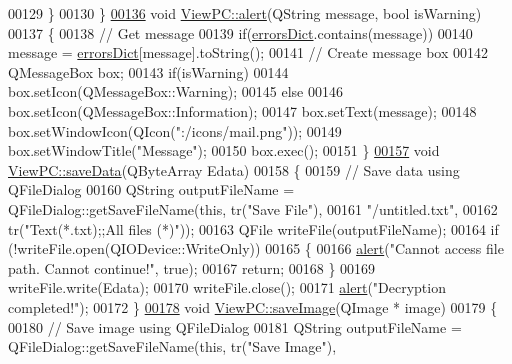 \begin{DoxyCode}
00129     \}
00130 \}
\hypertarget{viewpc_8cpp_source_l00136}{}\hyperlink{class_view_p_c_a7c467169467789561078abc9d4fe57bd}{00136} \textcolor{keywordtype}{void} \hyperlink{class_view_p_c_a7c467169467789561078abc9d4fe57bd}{ViewPC::alert}(QString message, \textcolor{keywordtype}{bool} isWarning)
00137 \{
00138     \textcolor{comment}{// Get message}
00139     \textcolor{keywordflow}{if}(\hyperlink{class_view_p_c_a26f90436aca32e5bad46f5e69a7e7e09}{errorsDict}.contains(message))
00140         message = \hyperlink{class_view_p_c_a26f90436aca32e5bad46f5e69a7e7e09}{errorsDict}[message].toString();
00141     \textcolor{comment}{// Create message box}
00142     QMessageBox box;
00143     \textcolor{keywordflow}{if}(isWarning)
00144         box.setIcon(QMessageBox::Warning);
00145     \textcolor{keywordflow}{else}
00146         box.setIcon(QMessageBox::Information);
00147     box.setText(message);
00148     box.setWindowIcon(QIcon(\textcolor{stringliteral}{":/icons/mail.png"}));
00149     box.setWindowTitle(\textcolor{stringliteral}{"Message"});
00150     box.exec();
00151 \}
\hypertarget{viewpc_8cpp_source_l00157}{}\hyperlink{class_view_p_c_aaff156103970be7c777beedaf0020604}{00157} \textcolor{keywordtype}{void} \hyperlink{class_view_p_c_aaff156103970be7c777beedaf0020604}{ViewPC::saveData}(QByteArray Edata)
00158 \{
00159     \textcolor{comment}{// Save data using QFileDialog}
00160     QString outputFileName = QFileDialog::getSaveFileName(\textcolor{keyword}{this}, tr(\textcolor{stringliteral}{"Save File"}),
00161                                \textcolor{stringliteral}{"/untitled.txt"},
00162                                tr(\textcolor{stringliteral}{"Text(*.txt);;All files (*)"}));
00163     QFile writeFile(outputFileName);
00164     \textcolor{keywordflow}{if} (!writeFile.open(QIODevice::WriteOnly))
00165     \{
00166         \hyperlink{class_view_p_c_a7c467169467789561078abc9d4fe57bd}{alert}(\textcolor{stringliteral}{"Cannot access file path. Cannot continue!"}, \textcolor{keyword}{true});
00167         \textcolor{keywordflow}{return};
00168     \}
00169     writeFile.write(Edata);
00170     writeFile.close();
00171     \hyperlink{class_view_p_c_a7c467169467789561078abc9d4fe57bd}{alert}(\textcolor{stringliteral}{"Decryption completed!"});
00172 \}
\hypertarget{viewpc_8cpp_source_l00178}{}\hyperlink{class_view_p_c_a7901ce10ffaaf2387bef1db7feea342d}{00178} \textcolor{keywordtype}{void} \hyperlink{class_view_p_c_a7901ce10ffaaf2387bef1db7feea342d}{ViewPC::saveImage}(QImage * image)
00179 \{
00180     \textcolor{comment}{// Save image using QFileDialog}
00181     QString outputFileName = QFileDialog::getSaveFileName(\textcolor{keyword}{this}, tr(\textcolor{stringliteral}{"Save Image"}),

\end{DoxyCode}
